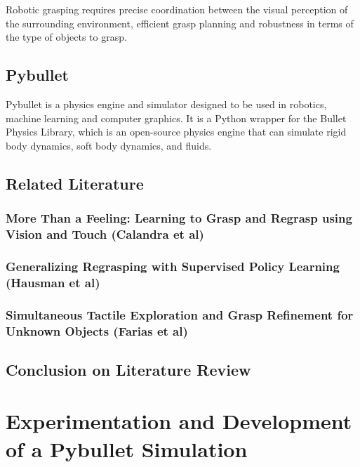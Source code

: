\documentclass[12pt, a4paper]{report}
\theoremstyle{definition}
\begin{document}
Robotic grasping requires precise coordination between the visual perception of the surrounding environment, efficient grasp planning and robustness in terms of the type of objects to grasp. 



\section{Pybullet}
Pybullet \cite{pybullet} is a physics engine and simulator designed to be used in robotics, machine learning and computer graphics. It is a Python wrapper for the Bullet Physics Library, which is an open-source physics engine that can simulate rigid body dynamics, soft body dynamics, and fluids.

\section{Related Literature}
\label{}
\subsection{More Than a Feeling: Learning to Grasp and Regrasp using Vision and Touch (Calandra et al)\cite{calandra}}
\label{}


\subsection{Generalizing Regrasping with Supervised Policy Learning (Hausman et al)\cite{hausman}}
\label{}


\subsection{Simultaneous Tactile Exploration and Grasp Refinement for Unknown Objects (Farias et al)\cite{farias}}
\label{}

\section{Conclusion on Literature Review}


\chapter{Experimentation and Development of a Pybullet Simulation}
\label{chap:3}
\end{document}
